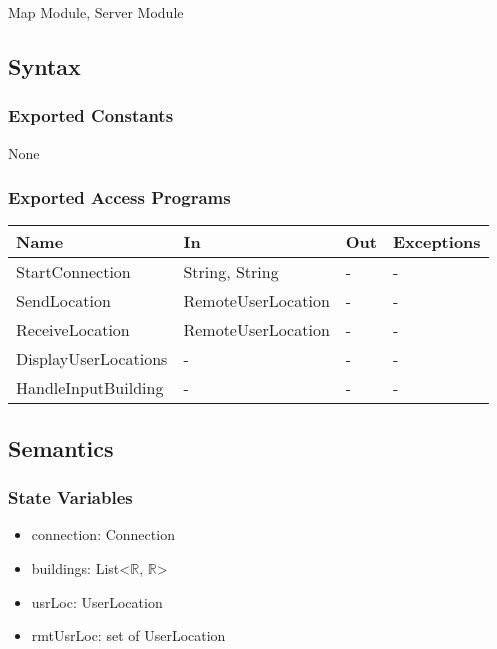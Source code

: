 \documentclass[12pt, titlepage]{article}
\begin{document}
Map Module, Server Module

\subsection{Syntax}

\subsubsection{Exported Constants}

None

\subsubsection{Exported Access Programs}

\begin{center}
\begin{tabular}{p{4cm} p{4cm} p{3cm} p{3cm}}
\hline
\textbf{Name} & \textbf{In} & \textbf{Out} & \textbf{Exceptions} \\
\hline
StartConnection & String, String & - & - \\
SendLocation & RemoteUserLocation & - & - \\
ReceiveLocation & RemoteUserLocation & - & - \\
DisplayUserLocations & - & - & - \\
HandleInputBuilding & - & - & - \\

\hline
\end{tabular}
\end{center}

\subsection{Semantics}

\subsubsection{State Variables}

\begin{itemize}
\item connection: Connection
\item buildings: List\textless\textlangle $\mathbb{R}$, $\mathbb{R}$\textrangle\textgreater 
\item usrLoc: UserLocation
\item rmtUsrLoc: set of UserLocation
\end{itemize}
\end{document}
